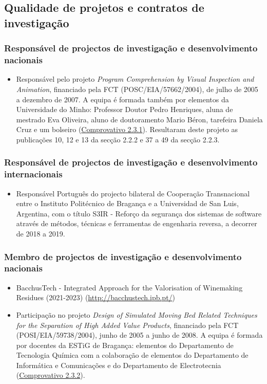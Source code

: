 \documentclass[11pt]{article}
\begin{document}
\subsection{Qualidade de projetos e contratos de investigação}
\subsubsection{Responsável de projectos de investigação e desenvolvimento nacionais}
\begin{itemize}
\item {Responsável pelo projeto {\em{ Program Comprehension by Visual Inspection and Animation}}, financiado pela FCT (POSC/EIA/57662/2004), de julho de 2005 a dezembro de 2007. A equipa é formada também por elementos da Universidade do Minho: Professor Doutor Pedro Henriques, aluna de mestrado Eva Oliveira, aluno de doutoramento Mario Béron, tarefeira Daniela Cruz e um bolseiro (\href{run:Projectos/ComprovativoPCVIA.pdf}{Comprovativo 2.3.1}). Resultaram deste projeto as publicações 10, 12 e 13 da secção 2.2.2 e 37 a 49 da secção 2.2.3.}
\end{itemize}
\subsubsection{Responsável de projectos de investigação e desenvolvimento internacionais}
\begin{itemize}
\item {Responsável Português do projecto bilateral de Cooperação Transnacional entre o Instituto Politécnico de Bragança e a Universidad de San Luis, Argentina, com o título S3IR - Reforço da segurança dos sistemas de software através de métodos, técnicas e ferramentas de engenharia reversa, a decorrer de 2018 a 2019.}
\end{itemize}
\subsubsection{Membro de projectos de investigação e desenvolvimento nacionais}
\begin{itemize}
\item {BacchusTech - Integrated Approach for the Valorisation of Winemaking Residues (2021-2023) (\url{http://bacchustech.ipb.pt/})}

\item {Participação no projeto {\em{ Design of Simulated Moving Bed Related Techniques for the Separation of High Added Value Products}}, financiado pela FCT (POSI/EIA/59738/2004), junho de 2005 a junho de 2008. A equipa é formada por docentes da ESTiG de Bragança: elementos do Departamento de Tecnologia Química com a colaboração de elementos do Departamento de Informática e Comunicações e do Departamento de Electrotecnia (\href{run:Projectos/ComprovativoDSMBRT.pdf}{Comprovativo 2.3.2}).}
\end{itemize}
\end{document}
